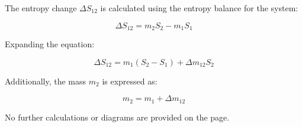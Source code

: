 The entropy change \( \Delta S_{12} \) is calculated using the entropy balance for the system:  

\[
\Delta S_{12} = m_2 S_2 - m_1 S_1
\]

Expanding the equation:  

\[
\Delta S_{12} = m_1 (S_2 - S_1) + \Delta m_{12} S_2
\]

Additionally, the mass \( m_2 \) is expressed as:  

\[
m_2 = m_1 + \Delta m_{12}
\]  

No further calculations or diagrams are provided on the page.